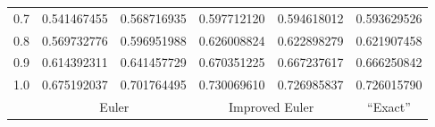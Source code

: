\begin{examplesolution}
\begin{newtable}
\begin{center}
\begin{tabular}{|c|r|r|r|r|r|}
      0.7                       & 0.541467455                   & 0.568716935                         & 0.597712120                   & 0.594618012                    & 0.593629526                     \\
      0.8                       & 0.569732776                   & 0.596951988                         & 0.626008824                   & 0.622898279                    & 0.621907458                     \\
      0.9                       & 0.614392311                   & 0.641457729                         & 0.670351225                   & 0.667237617                    & 0.666250842                     \\
      1.0                       & 0.675192037                   & 0.701764495                         & 0.730069610                   & 0.726985837                    & 0.726015790                     \\
      \hline
                                & \multicolumn{2}{c|}{Euler}    & \multicolumn{2}{c|}{Improved Euler} & \multicolumn{1}{c|}{``Exact''} \\
      \hline
    \end{tabular}
  \end{center}
\end{newtable}
\end{examplesolution}

